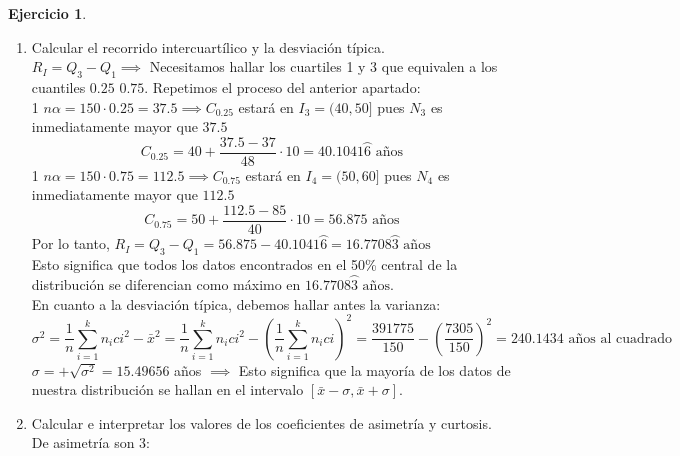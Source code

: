 \documentclass[a4paper, 12pt]{article}
\theoremstyle{definition}
\newtheorem{ej}{Ejercicio}
\begin{document}
\begin{ej}
\begin{enumerate}[label=\textit{\alph*)}]
    Lo que se nos pide es equivalente a calcular $C_{0.35}$ y $C_{0.65}$. Emplearemos la fórmula demostrada en el ejercicio 8: \\
    1 $n\alpha = 150\cdot0.35 = 52.5 \implies \ C_{0.35}$ estará en $I_{3}$ pues $N_{3}$ es inmediatamente mayor que $n_{\alpha}$ \\
    $$C_{0.35} = 40 + \frac{52.5 - 37}{48} \cdot 10 = 43.22291\wideparen{6} \text{ años (edad mínima)}$$
    Y para el cuantil $C_{0.65}$:\\
    1 $n\alpha = 150\cdot0.65 = 97.5 \implies$ Estará en $I_{4}$ ya que $N_{4}$ es inmediatamente superior a $n\alpha$
    $$C_{0.65} = 50 + \frac{97.5 - 85}{40} \cdot 10 = 53.125 \text{ años (edad máxima)}$$
    \item Calcular el recorrido intercuartílico y la desviación típica.\\
    $R_{I} = Q_{3} - Q_{1} \implies$ Necesitamos hallar los cuartiles 1 y 3 que equivalen a los cuantiles $0.25$ $0.75$. Repetimos el proceso del anterior apartado: \\
    1 $n\alpha = 150 \cdot 0.25 = 37.5 \implies C_{0.25}$ estará en $I_{3} = (40,50]$ pues $N_{3}$ es inmediatamente mayor que $37.5$
    $$C_{0.25} = 40 + \frac{37.5-37}{48} \cdot 10 = 40.1041\wideparen{6} \text{ años}$$
    1 $n\alpha = 150 \cdot 0.75 = 112.5 \implies C_{0.75}$ estará en $I_{4} = (50,60]$ pues $N_{4}$ es inmediatamente mayor que $112.5$
    $$C_{0.75} = 50 + \frac{112.5-85}{40} \cdot 10 = 56.875 \text{ años}$$
    Por lo tanto, $R_{I} = Q_{3} - Q_{1} = 56.875 - 40.1041\wideparen{6} = 16.7708\wideparen{3} \text{ años}$ \\
    Esto significa que todos los datos encontrados en el 50\% central de la distribución se diferencian como máximo en $16.7708\wideparen{3} \text{ años}$. \\ 
    En cuanto a la desviación típica, debemos hallar antes la varianza: 
    $$\sigma^2 = \frac{1}{n} \sum_{i = 1}^k n_{i}c{i}^2 - \bar{x}^2 = \frac{1}{n} \sum_{i = 1}^k n_{i}c{i}^2 - (\frac{1}{n} \sum_{i = 1}^k n_{i}c{i})^2 = \frac{391775}{150}- (\frac{7305}{150})^2 = 240.1434 \text{ años al cuadrado}$$
    $\sigma = +\sqrt{\sigma^2} = 15.49656$ años $\implies$ Esto significa que la mayoría de los datos de nuestra distribución se hallan en el intervalo $[\bar{x}-\sigma, \bar{x} + \sigma]$.
    \item Calcular e interpretar los valores de los coeficientes de asimetría y curtosis. \\
    De asimetría son 3: \\

\end{enumerate}
\end{ej}
\end{document}
